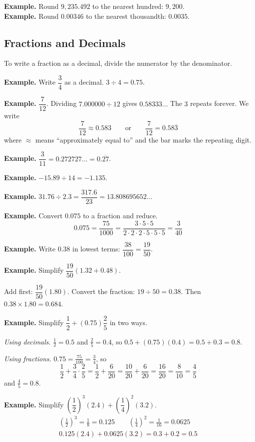 \documentclass[letter]{article}
\begin{document}
\textbf{Example.} Round $9{,}235.492$ to the nearest hundred: $9{,}200$.\\
\textbf{Example.} Round $0.00346$ to the nearest thousandth: $0.0035$.

\subsection{Fractions and Decimals}

To write a fraction as a decimal, divide the numerator by the denominator.

\textbf{Example.} Write $\dfrac34$ as a decimal. $3\div4=0.75$.

\textbf{Example.} $\dfrac7{12}$. Dividing $7.000000\div12$ gives $0.58333\ldots$ The $3$ repeats forever. We write
\[\frac7{12}\approx0.583\qquad\text{or}\qquad\frac7{12}=0.58\overline3\]
where $\approx$ means ``approximately equal to'' and the bar marks the repeating digit.

\textbf{Example.} $\dfrac3{11}=0.272727\ldots=0.\overline{27}$.

\textbf{Example.} $-15.89\div14=-1.135$.

\textbf{Example.} $31.76\div2.3=\dfrac{317.6}{23}=13.808695652\ldots$

\textbf{Example.} Convert $0.075$ to a fraction and reduce.
\[0.075=\frac{75}{1000}=\frac{3\cdot5\cdot5}{2\cdot2\cdot2\cdot5\cdot5\cdot5}=\frac3{40}\]

\textbf{Example.} Write $0.38$ in lowest terms: $\dfrac{38}{100}=\dfrac{19}{50}$.

\textbf{Example.} Simplify $\dfrac{19}{50}(1.32+0.48)$.

Add first: $\dfrac{19}{50}(1.80)$. Convert the fraction: $19\div50=0.38$. Then $0.38\times1.80=0.684$.

\textbf{Example.} Simplify $\dfrac12+(0.75)\dfrac25$ in two ways.

\emph{Using decimals.} $\frac12=0.5$ and $\frac25=0.4$, so $0.5+(0.75)(0.4)=0.5+0.3=0.8$.

\emph{Using fractions.} $0.75=\frac{75}{100}=\frac34$, so
\[\frac12+\frac34\cdot\frac25=\frac12+\frac6{20}=\frac{10}{20}+\frac6{20}=\frac{16}{20}=\frac{8}{10}=\frac45\]
and $\frac45=0.8$.

\textbf{Example.} Simplify $\left(\dfrac12\right)^3(2.4)+\left(\dfrac14\right)^2(3.2)$.
\begin{gather*}
  \left(\tfrac12\right)^3=\tfrac18=0.125\qquad\left(\tfrac14\right)^2=\tfrac1{16}=0.0625\\
  0.125(2.4)+0.0625(3.2)=0.3+0.2=0.5
\end{gather*}
\end{document}
